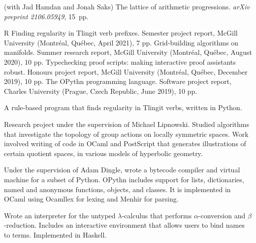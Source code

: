 
\begingroup\parindent=10pt
\thing (with Jad Hamdan and Jonah Saks)
The lattice of arithmetic progressions. {\sl arXiv preprint 2106.05949}, 15~pp.
\endgroup
\endgroup%

\goodbreak
{}

\pubbegin R
\repitem Finding regularity in Tlingit verb prefixes. Semester project report, McGill University
(Montr\'eal, Qu\'ebec, April 2021), 7 pp.
\repitem Grid-building algorithms on manifolds. Summer research report, McGill University (Montr\'eal, Qu\'ebec,
August 2020), 10 pp.
\repitem Typechecking proof scripts: making interactive proof assistants robust.
Honours project report, McGill University (Montr\'eal, Qu\'ebec, December 2019), 10 pp.
\repitem The OPythn programming language. Software project report, Charles University (Prague,
Czech Republic, June 2019), 10 pp.


\smallskip
A rule-based program that finds regularity in Tlingit verbs, written in Python.

\medbreak

\smallskip
Research project under the supervision of Michael Lipnowski.
Studied algorithms that investigate the topology of group actions on locally symmetric spaces.
Work involved writing of code in OCaml and PostScript that generates illustrations of certain quotient
spaces, in various models of hyperbolic geometry.

\medbreak

\smallskip
Under the supervision of Adam Dingle, wrote a bytecode compiler and virtual machine for a subset of Python.
OPythn includes support for lists, dictionaries, named and anonymous functions, objects, and classes.
It is implemented in OCaml using Ocamllex for lexing and Menhir for parsing.

\medbreak

\smallskip
Wrote an interpreter for the untyped $\lambda$-calculus that performs $\alpha$-conversion
and $\beta$-reduction. Includes an interactive environment that allows users to bind names to
terms. Implemented in Haskell.

